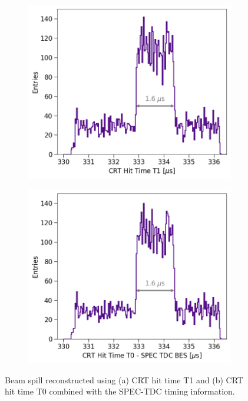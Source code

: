 \begin{figure}[hb!]
\begin{subfigure}[h]{0.495\linewidth}
\centering    
\includegraphics[width=\linewidth]{CRT_T1_TopHat}
\caption{}
\label{fig:topHat_T1}
\end{subfigure}%
\hfill
\begin{subfigure}[h]{0.495\linewidth}
\centering    
\includegraphics[width=\linewidth]{CRTT0_SPEC_TopHat}
\caption{}
\label{fig:topHat_T0}
\end{subfigure}
\caption[Reconstructed Beam Spill Using CRT Sharps]{
Beam spill reconstructed using (a) CRT hit time T1 and (b) CRT hit time T0 combined with the SPEC-TDC timing information. 
}
\label{fig:topHat}
\end{figure}


